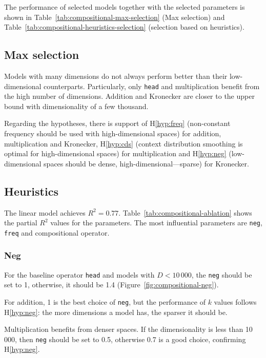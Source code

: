 The performance of selected models together with the selected parameters is shown in Table~\ref{tab:compositional-max-selection} (Max selection) and Table~\ref{tab:compositional-heuristics-selection} (selection based on heuristics).

\subsection{Max selection}
\label{sec:max-selection-compositional}

Models with many dimensions do not always perform better than their low-dimensional counterparts. Particularly, only \texttt{head} and multiplication benefit from the high number of dimensions. Addition and Kronecker are closer to the upper bound with dimensionality of a few thousand.

Regarding the hypotheses, there is support of H\ref{hyp:freq} (non-constant frequency should be used with high-dimensional spaces) for addition, multiplication and Kronecker, H\ref{hyp:cds} (context distribution smoothing is optimal for high-dimensional spaces) for multiplication and H\ref{hyp:neg} (low-dimensional spaces should be dense, high-dimensional---sparse) for Kronecker.

\subsection{Heuristics}
\label{sec:heuristics-compositional}



The linear model achieves  $R^2 = 0.77$. Table~\ref{tab:compositional-ablation} shows the partial $R^2$ values for the parameters. The most influential parameters are \texttt{neg}, \texttt{freq} and compositional operator.

\subsubsection{Neg}
\label{sec:neg-compositional}

For the baseline operator \texttt{head} and models with $D < 10\,000$, the \texttt{neg} should be set to 1, otherwise, it should be 1.4 (Figure~\ref{fig:compositional-neg}).

For addition, 1 is the best choice of \texttt{neg}, but the performance of $k$ values follows H\ref{hyp:neg}: the more dimensions a model has, the sparser it should be.

Multiplication benefits from denser spaces. If the dimensionality is less than 10\,000, then \texttt{neg} should be set to 0.5, otherwise 0.7 is a good choice, confirming H\ref{hyp:neg}.


